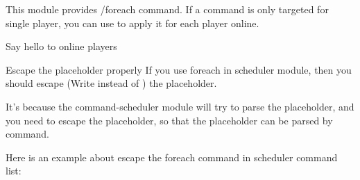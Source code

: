 
This module provides /foreach command.
If a command is only targeted for single player, you can use  to apply it for each player online.


\begin{example}{Say hello to online players}
\end{example}

\begin{tips}{Escape the placeholder properly}
    If you use foreach in scheduler module, then you should escape (Write  instead of ) the placeholder.

    It's because the command-scheduler module will try to parse the placeholder, and you need to escape the placeholder, so that the placeholder can be parsed by  command.

    Here is an example about escape the foreach command in scheduler command list: 
\end{tips}